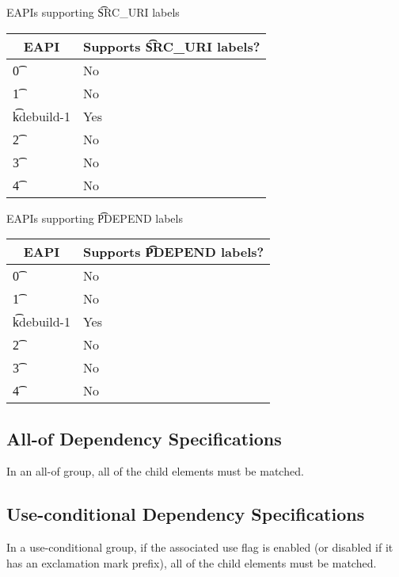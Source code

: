 \IFKDEBUILDELSE
{
    \begin{centertable}{EAPIs supporting \t{SRC\_URI} labels} \label{tab:uri-labels-table}
    \begin{tabular}{ l l }
        \toprule
        \multicolumn{1}{c}{\textbf{EAPI}} &
        \multicolumn{1}{c}{\textbf{Supports \t{SRC\_URI} labels?}} \\
        \midrule
    \t{0} & No \\
    \t{1} & No \\
    \t{kdebuild-1} & Yes \\
    \t{2} & No \\
    \t{3} & No \\
    \t{4} & No \\
    \bottomrule
    \end{tabular}
    \end{centertable}

    \begin{centertable}{EAPIs supporting \t{PDEPEND} labels} \label{tab:pdepend-labels-table}
    \begin{tabular}{ l l }
        \toprule
        \multicolumn{1}{c}{\textbf{EAPI}} &
        \multicolumn{1}{c}{\textbf{Supports \t{PDEPEND} labels?}} \\
        \midrule
    \t{0} & No \\
    \t{1} & No \\
    \t{kdebuild-1} & Yes \\
    \t{2} & No \\
    \t{3} & No \\
    \t{4} & No \\
    \bottomrule
    \end{tabular}
    \end{centertable}
}{
}

\subsection{All-of Dependency Specifications}

In an all-of group, all of the child elements must be matched.

\subsection{Use-conditional Dependency Specifications}

In a use-conditional group, if the associated use flag is enabled (or disabled if it has an
exclamation mark prefix), all of the child elements must be matched.


